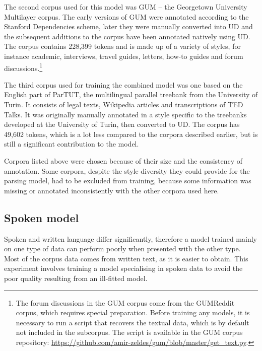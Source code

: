 The second corpus used for this model was GUM -- the Georgetown University Multilayer corpus. The early versions of GUM were annotated according to the Stanford Dependencies scheme, later they were manually converted into UD and the subsequent additions to the corpus have been annotated natively using UD. The corpus contains 228,399 tokens and is made up of a variety of styles, for instance academic, interviews, travel guides, letters, how-to guides and forum discussions.\footnote{The forum discussions in the GUM corpus come from the GUMReddit corpus, which requires special preparation. Before training any models, it is necessary to run a script that recovers the textual data, which is by default not included in the subcorpus. The script is available in the GUM corpus repository: \url{https://github.com/amir-zeldes/gum/blob/master/get_text.py}.} 

The third corpus used for training the combined model was one based on the English part of ParTUT, the multilingual parallel treebank from the University of Turin. It consists of legal texts, Wikipedia articles and transcriptions of TED Talks. It was originally manually annotated in a style specific to the treebanks developed at the University of Turin, then converted to UD. The corpus has 49,602 tokens, which is a lot less compared to the corpora described earlier, but is still a significant contribution to the model. 

Corpora listed above were chosen because of their size and the consistency of annotation. Some corpora, despite the style diversity they could provide for the parsing model, had to be excluded from training, because some information was missing or annotated inconsistently with the other corpora used here. 


\subsection{Spoken model}
Spoken and written language differ significantly, therefore a model trained mainly on one type of data can perform poorly when presented with the other type. Most of the corpus data comes from written text, as it is easier to obtain. This experiment involves training a model specialising in spoken data to avoid the poor quality resulting from an ill-fitted model. 

